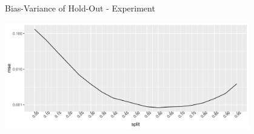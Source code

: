 \documentclass[11pt,compress,t,notes=noshow, xcolor=table]{beamer}
\begin{document}
\begin{vbframe}{Bias-Variance of Hold-Out - Experiment}
\begin{center}
\includegraphics[width=0.8\textwidth]{figure/test-holdout-example-2} 
\end{center}
\end{vbframe}




\endlecture
\end{document}
